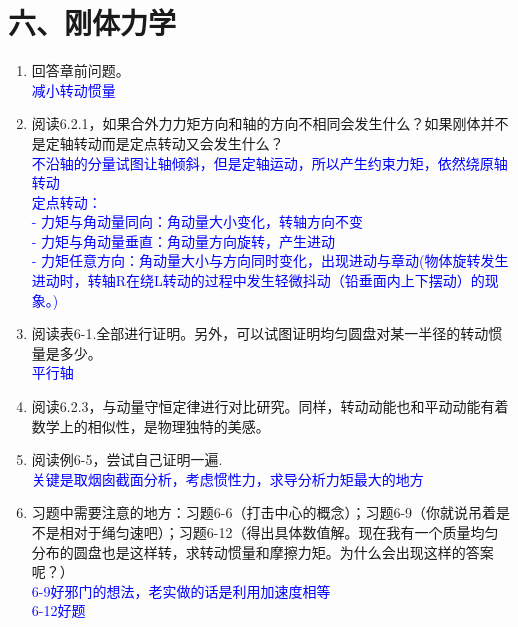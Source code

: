 \documentclass[12pt,a4paper]{article}
\begin{document}
\section{六、刚体力学}
\begin{enumerate}[label=\arabic*.,leftmargin=*]
    \item 回答章前问题。
\textcolor{blue}{\\减小转动惯量}
    \item 阅读6.2.1，如果合外力力矩方向和轴的方向不相同会发生什么？如果刚体并不是定轴转动而是定点转动又会发生什么？
\textcolor{blue}{\\不沿轴的分量试图让轴倾斜，但是定轴运动，所以产生约束力矩，依然绕原轴转动
\\定点转动：\\
- 力矩与角动量同向：角动量大小变化，转轴方向不变
\\- 力矩与角动量垂直：角动量方向旋转，产生进动
\\- 力矩任意方向：角动量大小与方向同时变化，出现进动与章动(物体旋转发生进动时，转轴R在绕L转动的过程中发生轻微抖动（铅垂面内上下摆动）的现象。)}
    \item 阅读表6-1.全部进行证明。另外，可以试图证明均匀圆盘对某一半径的转动惯量是多少。
\textcolor{blue}{\\平行轴}
    \item 阅读6.2.3，与动量守恒定律进行对比研究。同样，转动动能也和平动动能有着数学上的相似性，是物理独特的美感。

    \item 阅读例6-5，尝试自己证明一遍.
\textcolor{blue}{\\关键是取烟囱截面分析，考虑惯性力，求导分析力矩最大的地方}
    \item 习题中需要注意的地方：习题6-6（打击中心的概念）；习题6-9（你就说吊着是不是相对于绳匀速吧）；习题6-12（得出具体数值解。现在我有一个质量均匀分布的圆盘也是这样转，求转动惯量和摩擦力矩。为什么会出现这样的答案呢？）
\textcolor{blue}{\\6-9好邪门的想法，老实做的话是利用加速度相等
\\6-12好题}
\end{enumerate}
\end{document}

